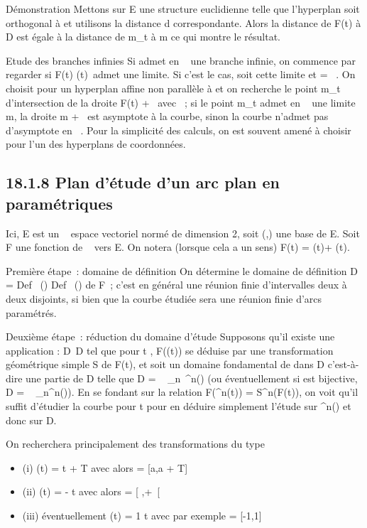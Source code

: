 \documentclass[]{article}
\begin{document}
Démonstration Mettons sur E une structure euclidienne telle que
l'hyperplan \Pi soit orthogonal à \vecD et utilisons la
distance d correspondante. Alors la distance de F(t) à D est égale à la
distance de m_t à m ce qui montre le résultat.

Etude des branches infinies Si \Gamma admet en \alpha~ une branche infinie, on
commence par regarder si  F(t) \over
\F(t)\ admet une
limite. Si c'est le cas, soit \vecu cette limite et
\vecD = ~\vecu. On choisit pour \Pi
un hyperplan affine non parallèle à \vecD et on
recherche le point m_t d'intersection de la droite F(t) +
~\vecu avec \Pi~; si le point m_t admet en \alpha~
une limite m, la droite m + ~\vecu est asymptote à la
courbe, sinon la courbe n'admet pas d'asymptote en \alpha~. Pour la simplicité
des calculs, on est souvent amené à choisir pour \Pi l'un des hyperplans
de coordonnées.

\subsection{18.1.8 Plan d'étude d'un arc plan en paramétriques}

Ici, E est un ~ espace vectoriel normé de dimension 2, soit
(\vec\imath,) une base de E. Soit
F une fonction de ~ vers E. On notera (lorsque cela a un sens) F(t) =
\phi(t)\vec\imath + \psi(t).

Première étape~: domaine de définition On détermine le domaine de
définition D = Def~ (\phi)
\bigcap Def~ (\psi) de F~; c'est en général une réunion
finie d'intervalles deux à deux disjoints, si bien que la courbe étudiée
sera une réunion finie d'arcs paramétrés.

Deuxième étape~: réduction du domaine d'étude Supposons qu'il existe une
application \theta : D\rightarrow~D tel que pour t \inD, F(\theta(t)) se déduise par une
transformation géométrique simple S de F(t), et soit \Delta un domaine
fondamental de \theta dans D c'est-à-dire une partie de D telle que D
= \⋃ ~
_n\in{}~\theta^n(\Delta) (ou éventuellement si \theta est bijective, D
= \⋃ ~
_n\in{}\theta^n(\Delta)). En se fondant sur la relation
F(\theta^n(t)) = S^n(F(t)), on voit qu'il suffit
d'étudier la courbe pour t \in \Delta pour en déduire simplement l'étude sur
\theta^n(\Delta) et donc sur D.

On recherchera principalement des transformations \theta du type

\begin{itemize}
\itemsep1pt\parskip0pt
\item
  (i) \theta(t) = t + T avec alors \Delta = [a,a + T] \bigcapD
\item
  (ii) \theta(t) = \omega - t avec alors \Delta = [ \omega {}
  ,+\infty~[\bigcapD
\item
  (iii) éventuellement \theta(t) = 1 \over t avec par
  exemple \Delta = [-1,1] \bigcapD
\end{itemize}
\end{document}
